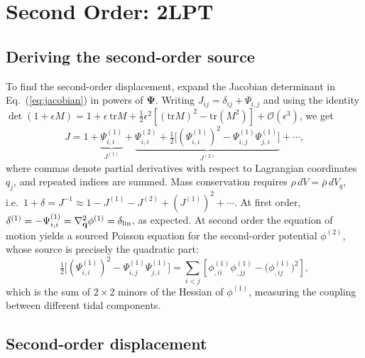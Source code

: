 \documentclass[12pt]{article}
\newcommand{\bq}{\mathbf{q}}
\newcommand{\bPsi}{\boldsymbol{\Psi}}
\begin{document}
\section{Second Order: 2LPT}
\label{sec:2lpt}

\subsection{Deriving the second-order source}
\label{sec:2lpt_derive}

To find the second-order displacement, expand the Jacobian
determinant in Eq.~(\ref{eq:jacobian}) in powers of $\bPsi$.
Writing $J_{ij} = \delta_{ij} + \Psi_{i,j}$ and using the identity
$\det(1+\epsilon M) = 1 + \epsilon\,\mathrm{tr}M +
\tfrac{1}{2}\epsilon^2[(\mathrm{tr}M)^2 - \mathrm{tr}(M^2)] +
\mathcal{O}(\epsilon^3)$, we get
%
\begin{equation}
  J = 1
    + \underbrace{\Psi_{i,i}^{(1)}}_{J^{(1)}}
    + \underbrace{\Psi_{i,i}^{(2)}
      + \tfrac{1}{2}\bigl[(\Psi_{i,i}^{(1)})^2
        - \Psi_{i,j}^{(1)}\Psi_{j,i}^{(1)}\bigr]}_{J^{(2)}}
    + \cdots,
  \label{eq:J_expand}
\end{equation}
%
where commas denote partial derivatives with respect to Lagrangian
coordinates $q_j$, and repeated indices are summed.  Mass
conservation requires $\rho\,dV = \bar\rho\,dV_q$, i.e.\
$1+\delta = J^{-1} \approx 1 - J^{(1)} - J^{(2)} + (J^{(1)})^2 + \cdots$.
At first order, $\delta^{(1)} = -\Psi^{(1)}_{i,i} = \nabla^2_\bq\phi^{(1)} = \delta_{\rm lin}$,
as expected.  At second order the equation of motion yields a
sourced Poisson equation for the second-order potential
$\phi^{(2)}$, whose source is precisely the quadratic part:
%
\begin{equation}
  \tfrac{1}{2}\bigl[(\Psi^{(1)}_{i,i})^2
    - \Psi^{(1)}_{i,j}\Psi^{(1)}_{j,i}\bigr]
  = \sum_{i<j}
    \left[\phi^{(1)}_{,ii}\phi^{(1)}_{,jj}
          - \bigl(\phi^{(1)}_{,ij}\bigr)^2\right],
  \label{eq:source_id}
\end{equation}
%
which is the sum of $2\!\times\!2$ minors of the Hessian of
$\phi^{(1)}$, measuring the coupling between different tidal
components.

\subsection{Second-order displacement}
\end{document}
